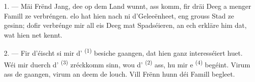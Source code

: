 %
%
%
%
%

\VUsaut{4.0mm}
\VUsaut{3.0mm}

\VUsaut{3.0mm}

1. --- Mäi Frënd Jang, dee op dem Land wunnt, ass komm, fir dräi Deeg a menger
Famill ze verbréngen.  elo hat hien nach ni d'Geleeënheet, eng grouss
Stad ze gesinn; dofir verbrénge mir all eis Deeg mat Spadséieren, an ech erkläre him
dat, wat hien net kennt.

2. --- Fir d'éischt si mir d' \textsuperscript{(1)} besiche
gaangen, dat hien ganz interesséiert huet. Wéi mir duerch d'
\textsuperscript{(3)} zréckkomm sinn, wou d'
\textsuperscript{(2)} ass, hu mir e  \textsuperscript{(4)}
begéint. Virum  ass de  gaangen, virum
 an deem de  louch. Vill Frënn hunn déi
 Famill begleet.

